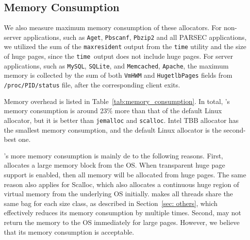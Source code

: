 \subsection{Memory Consumption}
\label{sec:memory}

We also measure maximum memory consumption of these allocators. For non-server applications, such as \texttt{Aget}, \texttt{Pbscanf}, \texttt{Pbzip2} and all PARSEC applications, we utilized the sum of the \texttt{maxresident} output from the \texttt{time} utility and the size of huge pages, since the \texttt{time }output does not include huge pages. 
For server applications, such as \texttt{MySQL}, \texttt{SQLite}, and \texttt{Memcached}, \texttt{Apache}, the maximum memory is collected by the sum of both \texttt{VmHWM} and \texttt{HugetlbPages} fields from \texttt{/proc/PID/status} file, after the corresponding client exits. 




Memory overhead is listed in Table~\ref{tab:memory_consumption}. In total, \NM{}'s memory consumption is around 23\% more than that of the default Linux allocator, but it is better than \texttt{jemalloc} and \texttt{scalloc}.  Intel TBB allocator has the smallest memory consumption, and the default Linux allocator is the second-best one. 
 
  \NM{}'s more memory consumption is mainly de to the following reasons. First, \NM{} allocates a large memory block from the OS. When transparent huge page support is enabled, then all memory will be allocated from huge pages. The same reason also applies for Scalloc, which also allocates a continuous huge region of virtual memory from the underlying OS initially. \NM{} makes all threads share the same bag for each size class, as described in Section~\ref{sec: others}, which effectively reduces its memory consumption by multiple times. Second, \NM{} may not return the memory to the OS immediately for large pages. However, we believe that its memory consumption is acceptable. 
 
